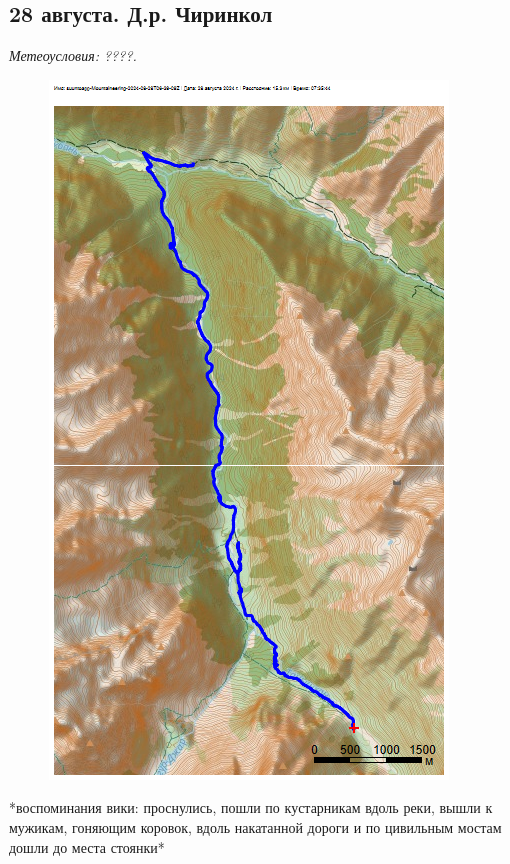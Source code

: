 \subsection{28 августа. Д.р. Чиринкол}

\textit{Метеоусловия: ????.}

\begin{figure}[h!]
	\centering
	\includegraphics[angle=0, width=0.3\linewidth]{../pics/mini_maps/28}
	\label{fig:mini_28}
\end{figure}

*воспоминания вики: проснулись, пошли по кустарникам вдоль реки, вышли к мужикам, гоняющим коровок, вдоль накатанной дороги и по цивильным мостам дошли до места стоянки*

\newpage